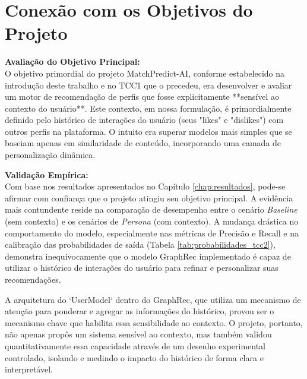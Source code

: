 \section{Conexão com os Objetivos do Projeto}
\label{sec:discussao_objetivos}

\textbf{Avaliação do Objetivo Principal:} \\
O objetivo primordial do projeto MatchPredict-AI, conforme estabelecido na introdução deste trabalho e no TCC1 que o precedeu, era desenvolver e avaliar um motor de recomendação de perfis que fosse explicitamente **sensível ao contexto do usuário**. Este contexto, em nossa formulação, é primordialmente definido pelo histórico de interações do usuário (seus "likes" e "dislikes") com outros perfis na plataforma. O intuito era superar modelos mais simples que se baseiam apenas em similaridade de conteúdo, incorporando uma camada de personalização dinâmica.

\textbf{Validação Empírica:} \\
Com base nos resultados apresentados no Capítulo \ref{chap:resultados}, pode-se afirmar com confiança que o projeto atingiu seu objetivo principal. A evidência mais contundente reside na comparação de desempenho entre o cenário \textit{Baseline} (sem contexto) e os cenários de \textit{Persona} (com contexto). A mudança drástica no comportamento do modelo, especialmente nas métricas de Precisão e Recall e na calibração das probabilidades de saída (Tabela \ref{tab:probabilidades_tcc2}), demonstra inequivocamente que o modelo GraphRec implementado é capaz de utilizar o histórico de interações do usuário para refinar e personalizar suas recomendações.

A arquitetura do `UserModel` dentro do GraphRec, que utiliza um mecanismo de atenção para ponderar e agregar as informações do histórico, provou ser o mecanismo chave que habilita essa sensibilidade ao contexto. O projeto, portanto, não apenas propôs um sistema sensível ao contexto, mas também validou quantitativamente essa capacidade através de um desenho experimental controlado, isolando e medindo o impacto do histórico de forma clara e interpretável.